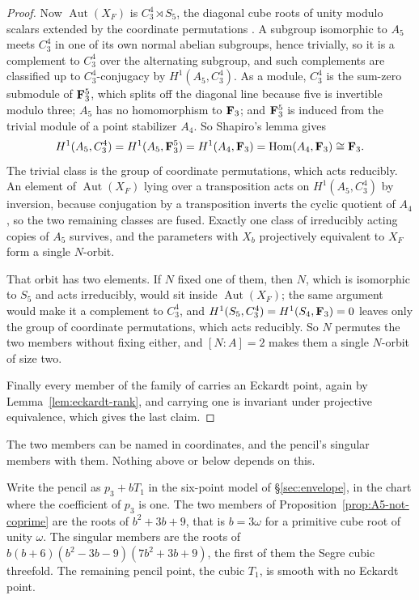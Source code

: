 \begin{proof}
Now \(\operatorname{Aut}(X_F)\) is \(C_3^4\rtimes S_5\), the diagonal cube
roots of unity modulo scalars extended by the coordinate permutations
\cite[Example~3.1]{WeiYu}.  A subgroup isomorphic to \(A_5\) meets \(C_3^4\)
in one of its own normal abelian subgroups, hence trivially, so it is a
complement to \(C_3^4\) over the alternating subgroup, and such complements
are classified up to \(C_3^4\)-conjugacy by \(H^1(A_5,C_3^4)\).  As a module,
\(C_3^4\) is the sum-zero submodule of \(\mathbf F_3^5\), which splits off the
diagonal line because five is invertible modulo three; \(A_5\) has no
homomorphism to \(\mathbf F_3\); and \(\mathbf F_3^5\) is induced from the trivial module of
a point stabilizer \(A_4\).  So Shapiro's lemma gives
\[
 H^1(A_5,C_3^4)=H^1(A_5,\mathbf F_3^5)=H^1(A_4,\mathbf F_3)=\operatorname{Hom}(A_4,\mathbf F_3)\cong\mathbf F_3 .
\]
The trivial class is the group of coordinate permutations, which acts
reducibly.  An element of \(\operatorname{Aut}(X_F)\) lying over a
transposition acts on \(H^1(A_5,C_3^4)\) by inversion, because conjugation by
a transposition inverts the cyclic quotient of \(A_4\), so the two remaining
classes are fused.  Exactly one class of irreducibly acting copies of \(A_5\)
survives, and the parameters with \(X_b\) projectively equivalent to \(X_F\)
form a single \(N\)-orbit.

That orbit has two elements.  If \(N\) fixed one of them, then \(N\), which is
isomorphic to \(S_5\) and acts irreducibly, would sit inside
\(\operatorname{Aut}(X_F)\); the same argument would make it a complement to
\(C_3^4\), and \(H^1(S_5,C_3^4)=H^1(S_4,\mathbf F_3)=0\) leaves only the group of
coordinate permutations, which acts reducibly.  So \(N\) permutes the two
members without fixing either, and \([N:A]=2\) makes them a single \(N\)-orbit
of size two.

Finally every member of the family of \cite[Theorem~3.3]{YYZ} carries an
Eckardt point, again by Lemma~\ref{lem:eckardt-rank}, and carrying one is
invariant under projective equivalence, which gives the last claim.
%
\end{proof}

The two members can be named in coordinates, and the pencil's singular members
with them.  Nothing above or below depends on this.

\begin{lemma}
\label{lem:pencil-loci-coordinates}
%
%
%
Write the pencil as \(p_3+bT_1\) in the six-point model of
\S\ref{sec:envelope}, in the chart where the coefficient of \(p_3\) is one.
The two members of Proposition~\ref{prop:A5-not-coprime} are the roots of
\(b^2+3b+9\), that is \(b=3\omega\) for a primitive cube root of unity
\(\omega\).  The singular members are the roots of
\(b(b+6)(b^2-3b-9)(7b^2+3b+9)\), the first of them the Segre cubic threefold.
The remaining pencil point, the cubic \(T_1\), is smooth with no Eckardt
point.
\end{lemma}


